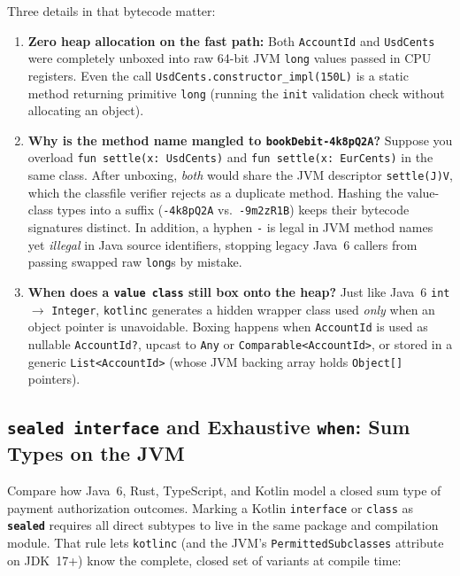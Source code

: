 Three details in that bytecode matter:
\begin{enumerate}
  \item \textbf{Zero heap allocation on the fast path:} Both \texttt{AccountId} and \texttt{UsdCents} were completely unboxed into raw 64-bit JVM \texttt{long} values passed in CPU registers. Even the call \texttt{UsdCents.\allowbreak{}constructor\_\allowbreak{}impl(150L)} is a static method returning primitive \texttt{long} (running the \texttt{init} validation check without allocating an object).
  \item \textbf{Why is the method name mangled to \texttt{bookDebit-4k8pQ2A}?} Suppose you overload \texttt{fun settle(x: UsdCents)} and \texttt{fun settle(x: EurCents)} in the same class. After unboxing, \emph{both} would share the JVM descriptor \texttt{settle(J)V}, which the classfile verifier rejects as a duplicate method. Hashing the value-class types into a suffix (\texttt{-4k8pQ2A} vs.\ \texttt{-9m2zR1B}) keeps their bytecode signatures distinct. In addition, a hyphen \texttt{-} is legal in JVM method names yet \emph{illegal} in Java source identifiers, stopping legacy Java~6 callers from passing swapped raw \texttt{long}s by mistake.
  \item \textbf{When does a \texttt{value class} still box onto the heap?} Just like Java~6 \texttt{int} $\to$ \texttt{Integer}, \texttt{kotlinc} generates a hidden wrapper class used \emph{only} when an object pointer is unavoidable. Boxing happens when \texttt{AccountId} is used as nullable \texttt{AccountId?}, upcast to \texttt{Any} or \texttt{Comparable<AccountId>}, or stored in a generic \texttt{List<AccountId>} (whose JVM backing array holds \texttt{Object[]} pointers).
\end{enumerate}

\subsection{\texttt{sealed interface} and Exhaustive \texttt{when}: Sum Types on the JVM}

Compare how Java~6, Rust, TypeScript, and Kotlin model a closed sum type of payment authorization outcomes. Marking a Kotlin \texttt{interface} or \texttt{class} as \textbf{\texttt{sealed}} requires all direct subtypes to live in the same package and compilation module. That rule lets \texttt{kotlinc} (and the JVM's \texttt{PermittedSubclasses} attribute on JDK~17+) know the complete, closed set of variants at compile time:

